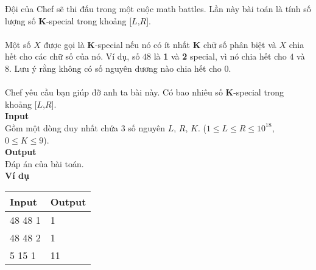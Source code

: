 Đội của Chef sẽ thi đấu trong một cuộc math battles. Lần này bài toán là tính số lượng số \textbf{K}-special trong khoảng [$L$,$R$].
\\
\\
Một số $X$ được gọi là \textbf{K}-special nếu nó có ít nhất \textbf{K} chữ số phân biệt và $X$ chia hết cho các chữ số của nó. Ví dụ, số $48$ là \textbf{1} và \textbf{2} special, vì nó chia hết cho $4$ và $8$. Lưu ý rằng không có số nguyên dương nào chia hết cho $0$.
\\
\\
Chef yêu cầu bạn giúp đỡ anh ta bài này. Có bao nhiêu số \textbf{K}-special trong khoảng [$L$,$R$]. 
\\

\textbf{Input}
\\
Gồm một dòng duy nhất chứa 3 số nguyên $L$, $R$, $K$. ($1 \leq L \leq R \leq 10^{18}$, $0 \leq K \leq 9$).
\\

\textbf{Output}
\\
Đáp án của bài toán.
\\

\textbf{Ví dụ}
\begin{table}[h!]
    \begin{center}
        \begin{tabular}{|p{6cm}|p{6cm}|}
            \hline
            \textbf{Input} & \textbf{Output} \\ 
            \hline
            48 48 1 & 1 \\
            \hline
            48 48 2 & 1 \\
            \hline 
            5 15 1 & 11 \\
            \hline
        \end{tabular}
    \end{center}
\end{table}



